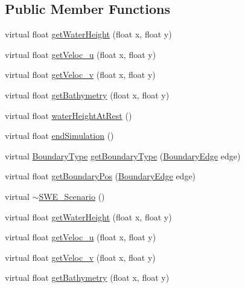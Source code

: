 \subsection*{Public Member Functions}
\begin{DoxyCompactItemize}
\item 
virtual float \hyperlink{classSWE__Scenario_ade6f356d60b1402c034611266462b88b}{get\+Water\+Height} (float x, float y)
\item 
virtual float \hyperlink{classSWE__Scenario_ab1d5e360c861df3c8c0ccd919bd7f495}{get\+Veloc\+\_\+u} (float x, float y)
\item 
virtual float \hyperlink{classSWE__Scenario_afeaf75872a1678ea64e6f7accd1e49c6}{get\+Veloc\+\_\+v} (float x, float y)
\item 
virtual float \hyperlink{classSWE__Scenario_afe09a1ba63304800651f25873570a348}{get\+Bathymetry} (float x, float y)
\item 
virtual float \hyperlink{classSWE__Scenario_a9de0f0f9fcc34dfe00c522b10c343d91}{water\+Height\+At\+Rest} ()
\item 
virtual float \hyperlink{classSWE__Scenario_ae7ed72f584069e9885c33c4ca83f3ff5}{end\+Simulation} ()
\item 
virtual \hyperlink{scenarios_2SWE__Scenario_8hh_af75d5dd7322fa39ed0af4e7839e600f8}{Boundary\+Type} \hyperlink{classSWE__Scenario_ab8fe7ce15d7758fb0c4e0e3887b34a5d}{get\+Boundary\+Type} (\hyperlink{scenarios_2SWE__Scenario_8hh_aa5e01e3f7df312f7b9b0d02521141fcc}{Boundary\+Edge} edge)
\item 
virtual float \hyperlink{classSWE__Scenario_a1b01e953c2079b64f527c9bc5a0c86d7}{get\+Boundary\+Pos} (\hyperlink{scenarios_2SWE__Scenario_8hh_aa5e01e3f7df312f7b9b0d02521141fcc}{Boundary\+Edge} edge)
\item 
virtual \hyperlink{classSWE__Scenario_a5e20e1061abfa36d814e0650a12a2e69}{$\sim$\+S\+W\+E\+\_\+\+Scenario} ()
\item 
virtual float \hyperlink{classSWE__Scenario_ade6f356d60b1402c034611266462b88b}{get\+Water\+Height} (float x, float y)
\item 
virtual float \hyperlink{classSWE__Scenario_ab1d5e360c861df3c8c0ccd919bd7f495}{get\+Veloc\+\_\+u} (float x, float y)
\item 
virtual float \hyperlink{classSWE__Scenario_afeaf75872a1678ea64e6f7accd1e49c6}{get\+Veloc\+\_\+v} (float x, float y)
\item 
virtual float \hyperlink{classSWE__Scenario_afe09a1ba63304800651f25873570a348}{get\+Bathymetry} (float x, float y)

\end{DoxyCompactItemize}
